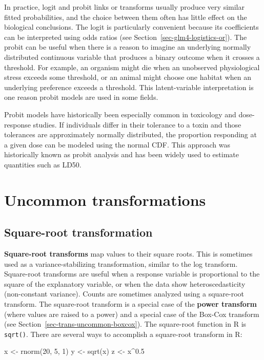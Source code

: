 \documentclass[
  13,
  letterpaper,
]{report}
\newenvironment{Shaded}{\begin{snugshade}}{\end{snugshade}}
\newcommand{\DecValTok}[1]{\textcolor[rgb]{0.68,0.00,0.00}{#1}}
\newcommand{\FloatTok}[1]{\textcolor[rgb]{0.68,0.00,0.00}{#1}}
\newcommand{\FunctionTok}[1]{\textcolor[rgb]{0.28,0.35,0.67}{#1}}
\newcommand{\NormalTok}[1]{\textcolor[rgb]{0.00,0.23,0.31}{#1}}
\newcommand{\OtherTok}[1]{\textcolor[rgb]{0.00,0.23,0.31}{#1}}
\newcommand{\SpecialCharTok}[1]{\textcolor[rgb]{0.37,0.37,0.37}{#1}}
\begin{document}
In practice, logit and probit links or transforms usually produce very
similar fitted probabilities, and the choice between them often has
little effect on the biological conclusions. The logit is particularly
convenient because its coefficients can be interpreted using odds ratios
(see Section~\ref{sec-glm4-logistics-or}). The probit can be useful when
there is a reason to imagine an underlying normally distributed
continuous variable that produces a binary outcome when it crosses a
threshold. For example, an organism might die when an unobserved
physiological stress exceeds some threshold, or an animal might choose
one habitat when an underlying preference exceeds a threshold. This
latent-variable interpretation is one reason probit models are used in
some fields.

Probit models have historically been especially common in toxicology and
dose-response studies. If individuals differ in their tolerance to a
toxin and those tolerances are approximately normally distributed, the
proportion responding at a given dose can be modeled using the normal
CDF. This approach was historically known as probit analysis and has
been widely used to estimate quantities such as LD50.

\section{Uncommon transformations}\label{sec-trans-uncommon}

\subsection{Square-root transformation}\label{sec-trans-uncommon-sqrt}

\textbf{Square-root transforms} map values to their square roots. This
is sometimes used as a variance-stabilizing transformation, similar to
the log transform. Square-root transforms are useful when a response
variable is proportional to the square of the explanatory variable, or
when the data show heteroscedasticity (non-constant variance). Counts
are sometimes analyzed using a square-root transform. The square-root
transform is a special case of the \textbf{power transform} (where
values are raised to a power) and a special case of the Box-Cox
transform (see Section~\ref{sec-trans-uncommon-boxcox}). The square-root
function in R is \texttt{sqrt()}. There are several ways to accomplish a
square-root transform in R:

\begin{Shaded}
\begin{Highlighting}[]
\NormalTok{x }\OtherTok{\textless{}{-}} \FunctionTok{rnorm}\NormalTok{(}\DecValTok{20}\NormalTok{, }\DecValTok{5}\NormalTok{, }\DecValTok{1}\NormalTok{)}
\NormalTok{y }\OtherTok{\textless{}{-}} \FunctionTok{sqrt}\NormalTok{(x)}
\NormalTok{z }\OtherTok{\textless{}{-}}\NormalTok{ x}\SpecialCharTok{\^{}}\FloatTok{0.5}
\end{Highlighting}
\end{Shaded}
\end{document}
